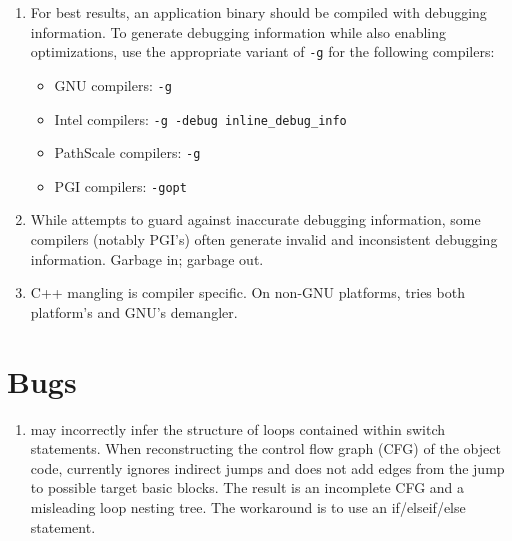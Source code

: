 \documentclass[english]{article}
\begin{document}
\begin{enumerate}

\item For best results, an application binary should be compiled with debugging information.
To generate debugging information while also enabling optimizations, use the appropriate variant of \verb+-g+ for the following compilers:
\begin{itemize}
\item GNU compilers: \verb+-g+
\item Intel compilers: \verb+-g -debug inline_debug_info+
\item PathScale compilers: \verb+-g+
\item PGI compilers: \verb+-gopt+
\end{itemize}

\item While  attempts to guard against inaccurate debugging information, some compilers (notably PGI's) often generate invalid and inconsistent debugging information.
Garbage in; garbage out.

\item C++ mangling is compiler specific. On non-GNU platforms, 
tries both platform's and GNU's demangler.

\end{enumerate}

\section{Bugs}

\begin{enumerate}

\item {} may incorrectly infer the structure of loops contained within switch statements.
When reconstructing the control flow graph (CFG) of the object code,  currently ignores indirect jumps and does not add edges from the jump to possible target basic blocks.
The result is an incomplete CFG and a misleading loop nesting tree.
The workaround is to use an if/elseif/else statement.

\end{enumerate}

\end{document}
